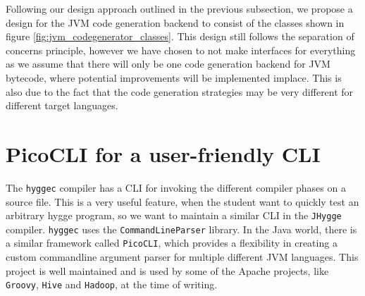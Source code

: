 Following our design approach outlined in the previous subsection, we propose a design for the JVM code generation backend to consist of the
classes shown in figure \ref{fig:jvm_codegenerator_classes}. This design still follows the separation of concerns principle, however we have chosen to not make interfaces for everything
as we assume that there will only be one code generation backend for JVM bytecode, where potential improvements will be implemented implace.
This is also due to the fact that the code generation strategies may be very different for different target languages.

\section{PicoCLI for a user-friendly CLI}

The \texttt{hyggec} compiler has a CLI for invoking the different compiler phases on a source file. This is a very useful feature,
when the student want to quickly test an arbitrary hygge program, so we want to maintain a similar CLI in the \texttt{JHygge} compiler.
\texttt{hyggec} uses the \texttt{CommandLineParser} library. In the Java world, there is a similar framework called \texttt{PicoCLI},
which provides a flexibility in creating a custom commandline argument parser for multiple different JVM languages. This project
is well maintained and is used by some of the Apache projects, like \texttt{Groovy}, \texttt{Hive} and \texttt{Hadoop}, at the time of writing.
